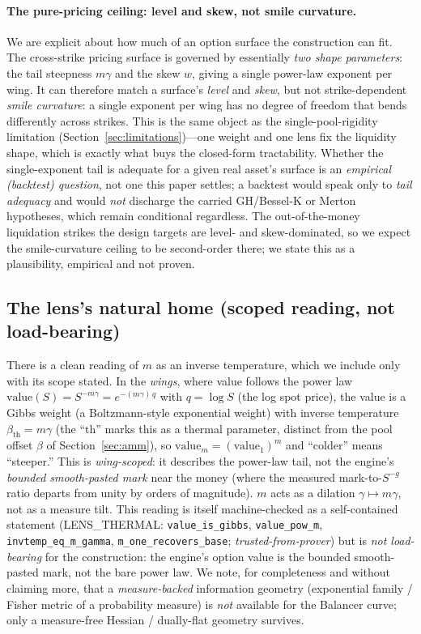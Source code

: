 \documentclass[runningheads]{llncs}
\newcommand{\tfp}{\emph{trusted-from-prover}}
\begin{document}
\paragraph{The pure-pricing ceiling: level and skew, not smile curvature.}
We are explicit about how much of an option surface the construction can fit. The
cross-strike pricing surface is governed by essentially \emph{two shape
parameters}: the tail steepness $m\gamma$ and the skew $w$, giving a single
power-law exponent per wing. It can therefore match a surface's \emph{level} and
\emph{skew}, but not strike-dependent \emph{smile curvature}: a single exponent
per wing has no degree of freedom that bends differently across strikes. This is
the same object as the single-pool-rigidity limitation
(Section~\ref{sec:limitations})---one weight and one lens fix the liquidity shape,
which is exactly what buys the closed-form tractability. Whether the
single-exponent tail is adequate for a given real asset's surface is an
\emph{empirical (backtest) question}, not one this paper settles; a backtest would
speak only to \emph{tail adequacy} and would \emph{not} discharge the carried
GH/Bessel-K or Merton hypotheses, which remain conditional regardless. The
out-of-the-money liquidation strikes the design targets are level- and
skew-dominated, so we expect the smile-curvature ceiling to be second-order there;
we state this as a plausibility, empirical and not proven.

\subsection{The lens's natural home (scoped reading, not load-bearing)}
\label{sec:gibbs}
There is a clean reading of $m$ as an inverse temperature, which we include only
with its scope stated. In the \emph{wings}, where value follows the power law
$\mathrm{value}(S)=S^{-m\gamma}=e^{-(m\gamma)\,q}$ with $q=\log S$ (the log spot
price), the value is a Gibbs weight (a Boltzmann-style exponential weight) with
inverse temperature $\beta_{\mathrm{th}}=m\gamma$ (the ``$\mathrm{th}$'' marks this
as a thermal parameter, distinct from the pool offset $\beta$ of
Section~\ref{sec:amm}), so
$\mathrm{value}_{m}=(\mathrm{value}_{1})^{m}$ and ``colder'' means ``steeper.''
This is \emph{wing-scoped}: it describes the power-law tail, not the engine's
\emph{bounded smooth-pasted mark} near the money (where the measured
mark-to-$S^{-g}$ ratio departs from unity by orders of magnitude). $m$ acts as a
dilation $\gamma\mapsto m\gamma$, not as a measure tilt. This reading is itself
machine-checked as a self-contained statement (LENS\_THERMAL:
\texttt{value\_is\_gibbs}, \texttt{value\_pow\_m},
\texttt{invtemp\_eq\_m\_gamma}, \texttt{m\_one\_recovers\_base}; \tfp{}) but is
\emph{not load-bearing} for the construction: the engine's option value is the
bounded smooth-pasted mark, not the bare power law. We note, for completeness and
without claiming more, that a \emph{measure-backed} information geometry
(exponential family / Fisher metric of a probability measure) is \emph{not}
available for the Balancer curve; only a measure-free Hessian / dually-flat
geometry survives.
\end{document}
